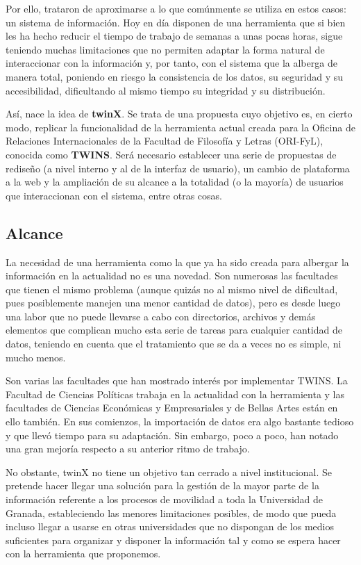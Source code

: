 Por ello, trataron de aproximarse a lo que comúnmente se utiliza en estos casos: un sistema de información. Hoy en día disponen de una herramienta que si bien les ha hecho reducir el tiempo de trabajo de semanas a unas pocas horas, sigue teniendo muchas limitaciones que no permiten adaptar la forma natural de interaccionar con la información y, por tanto, con el sistema que la alberga de manera total, poniendo en riesgo la consistencia de los datos, su seguridad y su accesibilidad, dificultando al mismo tiempo su integridad y su distribución.

Así, nace la idea de \textbf{twinX}. Se trata de una propuesta cuyo objetivo es, en cierto modo, replicar la funcionalidad de la herramienta actual creada para la Oficina de Relaciones Internacionales de la Facultad de Filosofía y Letras (ORI-FyL), conocida como \textbf{TWINS}. Será necesario establecer una serie de propuestas de rediseño (a nivel interno y al de la interfaz de usuario), un cambio de plataforma a la web y la ampliación de su alcance a la totalidad (o la mayoría) de usuarios que interaccionan con el sistema, entre otras cosas.

\subsection{Alcance}

La necesidad de una herramienta como la que ya ha sido creada para albergar la información en la actualidad no es una novedad. Son numerosas las facultades que tienen el mismo problema (aunque quizás no al mismo nivel de dificultad, pues posiblemente manejen una menor cantidad de datos), pero es desde luego una labor que no puede llevarse a cabo con directorios, archivos y demás elementos que complican mucho esta serie de tareas para cualquier cantidad de datos, teniendo en cuenta que el tratamiento que se da a veces no es simple, ni mucho menos.

Son varias las facultades que han mostrado interés por implementar TWINS. La Facultad de Ciencias Políticas trabaja en la actualidad con la herramienta y las facultades de Ciencias Económicas y Empresariales y de Bellas Artes están en ello también. En sus comienzos, la importación de datos era algo bastante tedioso y que llevó tiempo para su adaptación. Sin embargo, poco a poco, han notado una gran mejoría respecto a su anterior ritmo de trabajo.

No obstante, twinX no tiene un objetivo tan cerrado a nivel institucional. Se pretende hacer llegar una solución para la gestión de la mayor parte de la información referente a los procesos de movilidad a toda la Universidad de Granada, estableciendo las menores limitaciones posibles, de modo que pueda incluso llegar a usarse en otras universidades que no dispongan de los medios suficientes para organizar y disponer la información tal y como se espera hacer con la herramienta que proponemos.

